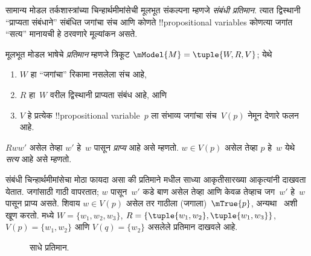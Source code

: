 \documentclass[../../../include/open-logic-section]{subfiles}
\begin{document}


सामान्य मोडल तर्कशास्त्रांच्या चिन्हार्थमीमांसेची मूलभूत संकल्पना
म्हणजे \emph{संबंधी प्रतिमान}. त्यात द्विस्थानी ``प्राप्यता संबंधाने''
संबंधित जगांचा संच आणि कोणते !!{propositional variable}s कोणत्या
जगांत ``सत्य'' मानायची हे ठरवणारे मूल्यांकन असते.

\begin{defn}
  मूलभूत मोडल भाषेचे \emph{प्रतिमान} म्हणजे त्रिकूट $\mModel{M}
  = \tuple{W, R, V}$; येथे
  \begin{enumerate}
  \item $W$ हा ``जगांचा'' रिकामा नसलेला संच आहे,
  \item $R$ हा~$W$ वरील द्विस्थानी प्राप्यता संबंध आहे, आणि
  \item $V$ हे प्रत्येक !!{propositional
    variable}~$p$ ला संभाव्य जगांचा संच~$V(p)$ नेमून देणारे फलन आहे.
  \end{enumerate}
  $Rww'$ असेल तेव्हा $w'$ हे~$w$ पासून \emph{प्राप्य}
  आहे असे म्हणतो. $w \in V(p)$ असेल तेव्हा $p$ हे~$w$ येथे
  \emph{सत्य} आहे असे म्हणतो.
\end{defn}

संबंधी चिन्हार्थमीमांसेचा मोठा फायदा असा की प्रतिमाने
 मधील साध्या आकृतीसारख्या आकृत्यांनी दाखवता
येतात. जगांसाठी गाठी वापरतात; $w$ पासून~$w'$ कडे बाण
असेल तेव्हा आणि केवळ तेव्हाच जग~$w'$ हे~$w$ पासून प्राप्य
असते. शिवाय $w \in V(p)$ असेल तर गाठीला (जगाला)~$\mTrue{p}$,
अन्यथा~ अशी खूण करतो.  मध्ये
$W = \{w_1, w_2, w_3\}$, $R = \{\tuple{w_1, w_2},\tuple{w_1,
  w_3}\}$, $V(p) = \{w_1, w_2\}$ आणि $V(q) = \{w_2\}$
असलेले प्रतिमान दाखवले आहे.

\begin{figure}
  \begin{center}
  \end{center}
  \caption{साधे प्रतिमान.}
\end{figure}
\end{document}
